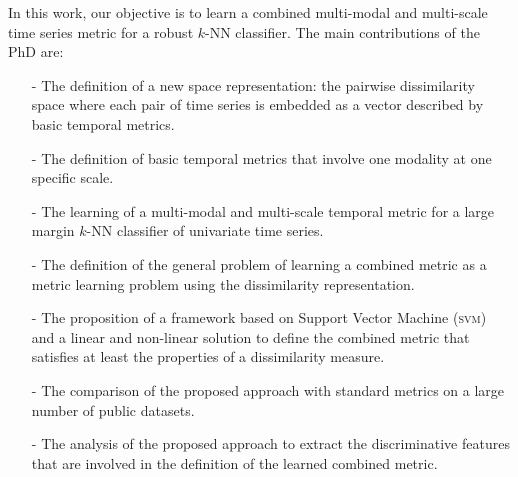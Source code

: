 In this work, our objective is to learn a combined multi-modal and multi-scale time series metric for a robust $k$-NN classifier. The main contributions of the PhD are:
\begin{itemize}
	\item[-] The definition of a new space representation: the pairwise dissimilarity space where each pair of time series is embedded as a vector described by basic temporal metrics.
	\item[-] The definition of basic temporal metrics that involve one modality at one specific scale.
	\item[-] The learning of a multi-modal and multi-scale temporal metric for a large margin $k$-NN classifier of univariate time series. 
	\item[-] The definition of the general problem of learning a combined metric as a metric learning problem using the dissimilarity representation. 
	\item[-] The proposition of a framework based on Support Vector Machine (\textsc{svm}) and a linear and non-linear solution to define the combined metric that satisfies at least the properties of a dissimilarity measure.
	\item[-] The comparison of the proposed approach with standard metrics on a large number of public datasets.
	\item[-] The analysis of the proposed approach to extract the discriminative features that are involved in the definition of the learned combined metric. 
\end{itemize}


